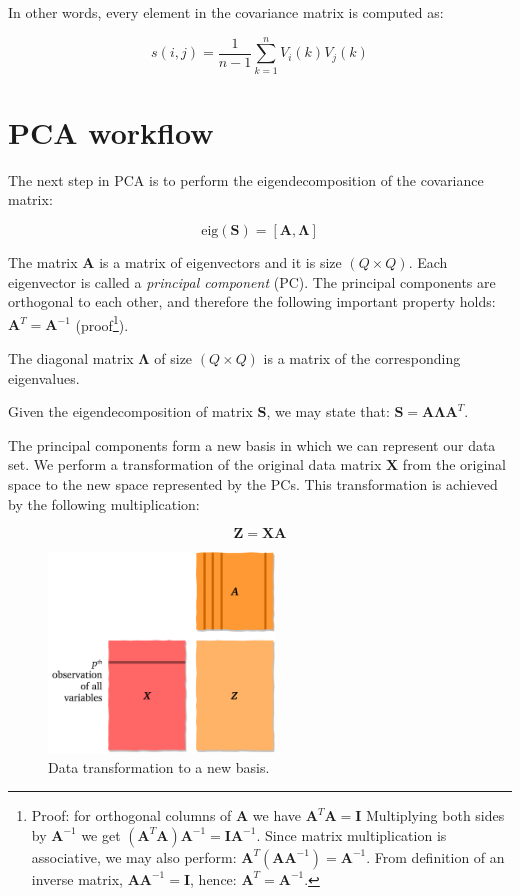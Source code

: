 \documentclass[10pt,twocolumn]{article}
\begin{document}
In other words, every element in the covariance matrix is computed as:

\begin{equation}
s(i,j) = \frac{1}{n-1} \sum\limits_{k=1}^n V_i(k) V_j(k)
\end{equation}



\section{PCA workflow}

The next step in PCA is to perform the eigendecomposition of the covariance matrix:

\begin{equation} \label{eq:eig-dec}
\text{eig}(\bm{S}) = [\bm{A}, \bm{\Lambda}]
\end{equation}

The matrix $\bm{A}$ is a matrix of eigenvectors and it is size $(Q \times Q)$. Each eigenvector is called a \textit{principal component} (PC). The principal components are orthogonal to each other, and therefore the following important property holds: $\bm{A}^T = \bm{A}^{-1}$ (proof\footnote{Proof: for orthogonal columns of $\bm{A}$ we have $\bm{A}^T \bm{A} = \bm{I}$ Multiplying both sides by $\bm{A}^{-1}$ we get $(\bm{A}^T \bm{A}) \bm{A}^{-1}= \bm{I}\bm{A}^{-1}$. Since matrix multiplication is associative, we may also perform: $\bm{A}^T (\bm{A} \bm{A}^{-1}) = \bm{A}^{-1}$. From definition of an inverse matrix,  $\bm{A} \bm{A}^{-1} = \bm{I}$, hence: $\bm{A}^T = \bm{A}^{-1}$.}).

The diagonal matrix $\bm{\Lambda}$ of size $(Q \times Q)$ is a matrix of the corresponding eigenvalues.

Given the eigendecomposition of matrix $\bm{S}$, we may state that: $\bm{S} = \bm{A} \bm{\Lambda} \bm{A}^T$.

The principal components form a new basis in which we can represent our data set. We perform a transformation of the original data matrix $\bm{X}$ from the original space to the new space represented by the PCs. This transformation is achieved by the following multiplication:

\begin{equation} \label{eq:data-transform}
\bm{Z} = \bm{X} \bm{A}
\end{equation}

\begin{figure}[H]
\centering\includegraphics[width=6cm]{data-transformation.png}
\caption{Data transformation to a new basis.}
\label{fig:data-transformation}
\end{figure}
\end{document}
